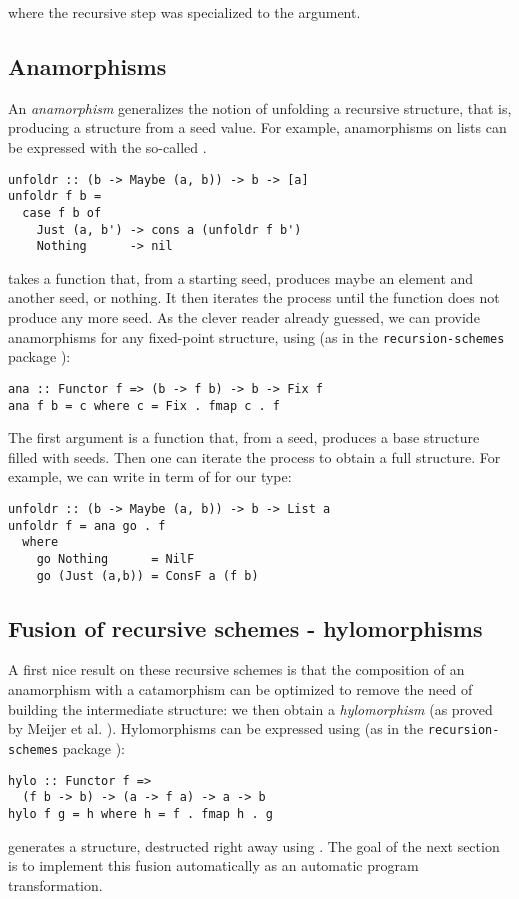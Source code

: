 \noindent
where the recursive step was specialized to the  argument.

\subsection{Anamorphisms}
An \emph{anamorphism} generalizes the notion of unfolding a recursive structure, that is, producing a structure from a seed value.
For example, anamorphisms on lists can be expressed with the so-called .
\begin{verbatim}
unfoldr :: (b -> Maybe (a, b)) -> b -> [a]
unfoldr f b =
  case f b of
    Just (a, b') -> cons a (unfoldr f b')
    Nothing      -> nil
\end{verbatim}

\noindent {} takes a function that, from a starting seed, produces maybe an element and another seed, or nothing. It then iterates the process until the function does not produce any more seed. As the clever reader already guessed, we can provide anamorphisms for any fixed-point structure, using  (as in the \verb|recursion-schemes| package \cite{ekmett:eschems}):
\begin{verbatim}
ana :: Functor f => (b -> f b) -> b -> Fix f
ana f b = c where c = Fix . fmap c . f
\end{verbatim}
The first argument is a function that, from a seed, produces a base structure filled with seeds. Then one can iterate the process to obtain a full structure. For example, we can write  in term of  for our  type:
\begin{verbatim}
unfoldr :: (b -> Maybe (a, b)) -> b -> List a
unfoldr f = ana go . f
  where
    go Nothing      = NilF
    go (Just (a,b)) = ConsF a (f b)
\end{verbatim}

\subsection{Fusion of recursive schemes - hylomorphisms}
A first nice result on these recursive schemes is that the composition of an anamorphism with a catamorphism can be optimized to remove the need of building the intermediate structure: we then obtain a \emph{hylomorphism} (as proved by Meijer et al. \cite{4cec4a43c86444479dc0003182424795}).
Hylomorphisms can be expressed using  (as in the \verb|recursion-schemes| package \cite{ekmett:eschems}):
\begin{verbatim}
hylo :: Functor f =>
  (f b -> b) -> (a -> f a) -> a -> b
hylo f g = h where h = f . fmap h . g
\end{verbatim}
\noindent {} generates a structure, destructed right away using .
The goal of the next section is to implement this fusion automatically as an automatic program transformation.